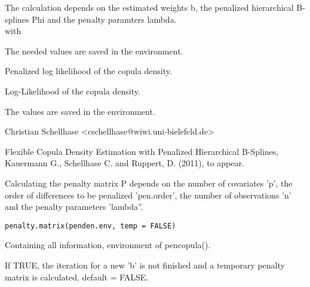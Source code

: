 \documentclass[a4paper]{book}
\begin{document}
%
\begin{Details}\relax
The calculation depends on the estimated weights b, the penalized
hierarchical B-splines Phi and the penalty paramters lambda.\\{}
with

The needed values are saved in the environment.
\end{Details}
%
\begin{Value}
\begin{ldescription}
\item[\code{pen.log.like}] Penalized log likelihood of the copula density.
\item[\code{log.like}] Log-Likelihood of the copula density.
\end{ldescription}
The values are saved in the environment.
\end{Value}
%
\begin{Author}\relax
Christian Schellhase <cschellhase@wiwi.uni-bielefeld.de>
\end{Author}
%
\begin{References}\relax
Flexible Copula Density Estimation with Penalized
Hierarchical B-Splines, Kauermann G., Schellhase C. and Ruppert, D. (2011), to appear.
\end{References}
%
\begin{Description}\relax
Calculating the penalty matrix P depends on the number of
covariates 'p', the order of differences to be penalized 'pen.order',
the number of observations 'n' and the penalty parameters 'lambda''.
\end{Description}
%
\begin{Usage}
\begin{verbatim}
penalty.matrix(penden.env, temp = FALSE)
\end{verbatim}
\end{Usage}
%
\begin{Arguments}
\begin{ldescription}
\item[\code{penden.env}] Containing all information, environment of
pencopula().
\item[\code{temp}] If TRUE, the iteration for a new 'b' is not finished and a temporary penalty matrix is calculated, default = FALSE.
\end{ldescription}
\end{Arguments}
\end{document}
